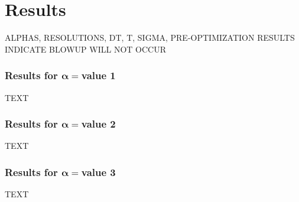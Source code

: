 \chapter{Results}

ALPHAS, RESOLUTIONS, DT, T, SIGMA, 
PRE-OPTIMIZATION RESULTS INDICATE BLOWUP WILL NOT OCCUR
\subsection{Results for $\boldsymbol{\alpha= }$value 1}
TEXT
\subsection{Results for $\boldsymbol{\alpha= }$value 2}
TEXT
\subsection{Results for $\boldsymbol{\alpha= }$value 3}
TEXT